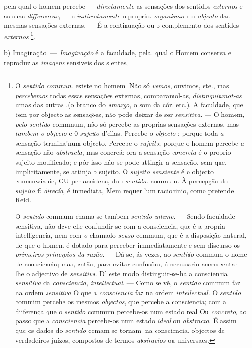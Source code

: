 pela qual o homem percebe --- \emph{directamente} as sensações dos sentidos \emph{externos} e as suas \emph{differencas}, --- e \emph{indirectamente} o proprio. \emph{organismo} e o \emph{objecto} das mesmas sensações externas. --- É a continuação ou o complemento dos sentidos \emph{externos} \footnote{O \emph{sentido commun}. existe no homem. Não só \emph{vemos}, ouvimos, ete., mas \emph{percebemos} todas essas sensações externas, comparamol-as, \emph{distinguinmot-as} umas das outras .(o branco do \emph{amargo}, o som da cór, etc.). A faculdade, que tem por objecto as sensações, não pode deixar de ser \emph{sensitiva}. --- O homem, \emph{pelo sentido} commnum, não só percebe as proprias sensações externas, mas \emph{tambem o objecto} e 0 \emph{sujeito} d'ellas. Percebe o \emph{objecto} ; porque toda \emph{a} sensação termina'num objecto. Percebe o \emph{sujeito}; porque o homem percebe \emph{a} sensação não \emph{abstracta}, mas concreá; ora a sensação \emph{concreta} é o proprio sujeito modificado; e pór isso não se pode attingir a sensação, sem que, implicitamente, se attinja o sujeito. O \emph{sujeito sensiente} é o objecto conconwianie, OU per accidens, do : \emph{sentido}. commum. À percepção do \emph{sujeito} € \emph{direcía}, é inmediata, Mem requer 'um raciocinio, como pretende Reid.\par O \emph{sentido} commum chama-se tambem \emph{sentido intimo}. --- Sendo faculdade sensitiva, não deve elle confundir-se com a consciencia, que é a propria intelligencia, nem com \emph{o} chamado \emph{senso} commum, que é a disposição natural, de que o homem é dotado para perceber immediatamente e sem discurso os \emph{primeiros principios da razão}. --- Dá-se, ás vezes, ao \emph{sentido} commum o nome de consciencia; mas, então, para evitar confusões, é necessario accrescentar-lhe o adjectivo de \emph{sensitiva}. D' este modo distinguir-se-ha a consciencia \emph{sensitiva} da \emph{consciencia}, \emph{intellectual}. --- Como se vê, o \emph{sentido} commum faz na ordem \emph{sensitiva} O que a \emph{consciencia} faz na ordem \emph{intellectual}. O \emph{sentido} commim percehe os mesmos \emph{objectos}, que percebe a consciencia; com a diiferença que o \emph{sentido} commum percebe-os num estado real Ou \emph{concreto}, ao passo que a \emph{consciencia} percebe-os num estado \emph{ideal} ou \emph{abstracto}. É assim que os dados do \emph{sentido} comam se tornam, na consciencia, objectos de verdadeiros juízos, compostos de termos \emph{absíracios} ou universaes.}.

b) Imaginação. --- \emph{Imaginação} é a faculdade, pela. qual o   Homem conserva e reproduz as \emph{imagens} sensiveis dos s entes,

